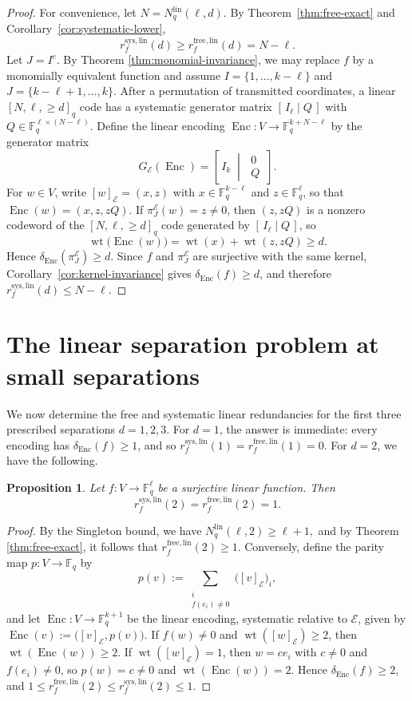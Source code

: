 \documentclass[a4paper,12pt]{article}
\theoremstyle{plain}
\newtheorem{proposition}[lemma]{Proposition}
\theoremstyle{definition}
\newcommand{\F}{\mathbb F}
\newcommand{\wt}{\operatorname{wt}}
\newcommand{\Enc}{\operatorname{Enc}}
\newcommand{\Nlin}{N_q^{\mathrm{lin}}}
\begin{document}
\begin{proof}
For convenience, let $N=\Nlin(\ell,d)$. By Theorem~\ref{thm:free-exact} and
Corollary~\ref{cor:systematic-lower},
\[
r_f^{\mathrm{sys,lin}}(d)\geq r_f^{\mathrm{free,lin}}(d)=N-\ell.
\]
Let $J=I^c$. 
By Theorem \ref{thm:monomial-invariance}, we may replace $f$ by a monomially equivalent function and assume
$I=\{1,\dots,k-\ell\}$ and $J=\{k-\ell+1,\dots,k\}$. After a permutation of transmitted coordinates, a
linear $[N,\ell,\geq d]_q$ code has a systematic generator matrix
$[\,I_\ell\mid Q\,]$ with $Q\in\F_q^{\ell\times(N-\ell)}$. Define
the linear encoding $\Enc\colon V\to\F_q^{k+N-\ell}$ by the
generator matrix
\[
G_{\mathcal E}(\Enc)
=
\left[\,I_k\;\middle|\;
\begin{matrix}0\\ Q\end{matrix}\,\right].
\]
For $w\in V$, write $[w]_{\mathcal E}=(x,z)$ with
$x\in\F_q^{k-\ell}$ and $z\in\F_q^{\ell}$, so that
$\Enc(w)=(x,z,zQ)$. If $\pi_J^{\mathcal E}(w)=z\neq0$, then
$(z,zQ)$ is a nonzero codeword of the $[N,\ell,\geq d]_q$ code
generated by $[\,I_\ell\mid Q\,]$, so
\[
\wt\bigl(\Enc(w)\bigr)
=
\wt(x)+\wt(z,zQ)
\geq d.
\]
Hence $\delta_{\Enc}(\pi_J^{\mathcal E})\geq d$. Since $f$ and
$\pi_J^{\mathcal E}$ are surjective with the same kernel,
Corollary~\ref{cor:kernel-invariance} gives
$\delta_{\Enc}(f)\geq d$, and therefore
$r_f^{\mathrm{sys,lin}}(d)\leq N-\ell$.
\end{proof}


\section{The linear separation problem at small separations}
\label{sec:distance-three}

We now determine the free and systematic linear redundancies for the first three prescribed separations $d=1,2,3$. For $d=1$, the answer is immediate: every encoding
has $\delta_{\Enc}(f)\geq1$, and so $r_f^{\mathrm{sys,lin}}(1)=r_f^{\mathrm{free,lin}}(1)=0$.
For $d=2$, we have the following. 
\begin{proposition}
\label{prop:small-separations}
Let $f\colon V\to\F_q^\ell$ be a surjective linear function. Then
\[
r_f^{\mathrm{sys,lin}}(2)=r_f^{\mathrm{free,lin}}(2)=1.
\]
\end{proposition}

\begin{proof}
By the Singleton bound, we have $\Nlin(\ell,2)\ge\ell+1,$
and by Theorem  \ref{thm:free-exact}, it follows that $r_f^{\mathrm{free,lin}}(2)\geq1$. Conversely,
define the parity map $p\colon V\to\F_q$ by
\[
p(v):=\sum_{\substack{i\\ f(e_i)\neq0}}\bigl([v]_{\mathcal E}\bigr)_i,
\]
and let $\Enc\colon V\to\F_q^{k+1}$ be the linear encoding,
systematic relative to $\mathcal E$, given by
$\Enc(v):=\bigl([v]_{\mathcal E},p(v)\bigr)$. If $f(w)\neq0$ and
$\wt([w]_{\mathcal E})\geq2$, then $\wt(\Enc(w))\geq2$. If
$\wt([w]_{\mathcal E})=1$, then $w=ce_i$ with $c\neq0$ and
$f(e_i)\neq0$, so $p(w)=c\neq0$ and $\wt(\Enc(w))=2$. Hence
$\delta_{\Enc}(f)\geq2$, and
$1\leq r_f^{\mathrm{free,lin}}(2)\leq
r_f^{\mathrm{sys,lin}}(2)\leq1$.
\end{proof}
\end{document}
